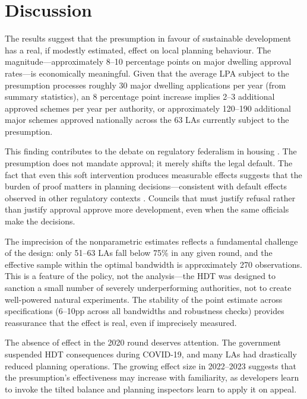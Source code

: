 \documentclass[12pt]{article}
\begin{document}



\section{Discussion}

The results suggest that the presumption in favour of sustainable development has a real, if modestly estimated, effect on local planning behaviour. The magnitude---approximately 8--10 percentage points on major dwelling approval rates---is economically meaningful. Given that the average LPA subject to the presumption processes roughly 30 major dwelling applications per year (from summary statistics), an 8 percentage point increase implies 2--3 additional approved schemes per year per authority, or approximately 120--190 additional major schemes approved nationally across the 63 LAs currently subject to the presumption.

This finding contributes to the debate on regulatory federalism in housing \citep{fischel2001, hilber2016}. The presumption does not mandate approval; it merely shifts the legal default. The fact that even this soft intervention produces measurable effects suggests that the burden of proof matters in planning decisions---consistent with default effects observed in other regulatory contexts \citep{madrian2001, johnson2003}. Councils that must justify refusal rather than justify approval approve more development, even when the same officials make the decisions.

The imprecision of the nonparametric estimates reflects a fundamental challenge of the design: only 51--63 LAs fall below 75\% in any given round, and the effective sample within the optimal bandwidth is approximately 270 observations. This is a feature of the policy, not the analysis---the HDT was designed to sanction a small number of severely underperforming authorities, not to create well-powered natural experiments. The stability of the point estimate across specifications (6--10pp across all bandwidths and robustness checks) provides reassurance that the effect is real, even if imprecisely measured.

The absence of effect in the 2020 round deserves attention. The government suspended HDT consequences during COVID-19, and many LAs had drastically reduced planning operations. The growing effect size in 2022--2023 suggests that the presumption's effectiveness may increase with familiarity, as developers learn to invoke the tilted balance and planning inspectors learn to apply it on appeal.
\end{document}
